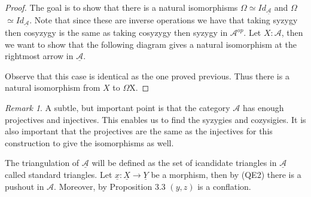 \documentclass[12pt]{article}
\theoremstyle{definition}
\theoremstyle{remark}
\newtheorem*{remark}{Remark}
\newcommand{\upside}[1]{\rotatebox[origin=c]{180}{#1}}
\begin{document}
            \begin{proof}
                The goal is to show that there is a natural isomorphisms \underline{$\Omega$\upside{$\Omega$}}$\simeq Id_{\underline{\mathcal{A}}}$ and \underline{\upside{$\Omega$}$\Omega$}$\simeq Id_{\underline{\mathcal{A}}}$. Note that since these are inverse operations we have that taking syzygy then cosyzygy is the same as taking cosyzygy then syzygy in $\mathcal{A}^{op}$.
                Let $X:\mathcal{A}$, then we want to show that the following diagram gives a natural isomorphism at the rightmost arrow in $\underline{\mathcal{A}}$.
                \begin{center}
                \end{center}
                Observe that this case is identical as the one proved previous. Thus there is a natural isomorphism from $X$ to \upside{$\Omega$}$\Omega$X.
            \end{proof}

            \begin{remark}
                A subtle, but important point is that the category $\mathcal{A}$ has enough projectives and injectives. This enables us to find the syzygies and cozysigies. It is also important that the projectives are the same as the injectives for this construction to give the isomorphisms as well.
            \end{remark}

            The triangulation of $\underline{\mathcal{A}}$ will be defined as the set of icandidate triangles in $\underline{\mathcal{A}}$ called standard triangles. Let $\underline{x}:\underline{X}\rightarrow\underline{Y}$ be a morphism, then by (QE2) there is a pushout in $\mathcal{A}$. Moreover, by Proposition 3.3 $(y,z)$ is a conflation.
\end{document}
